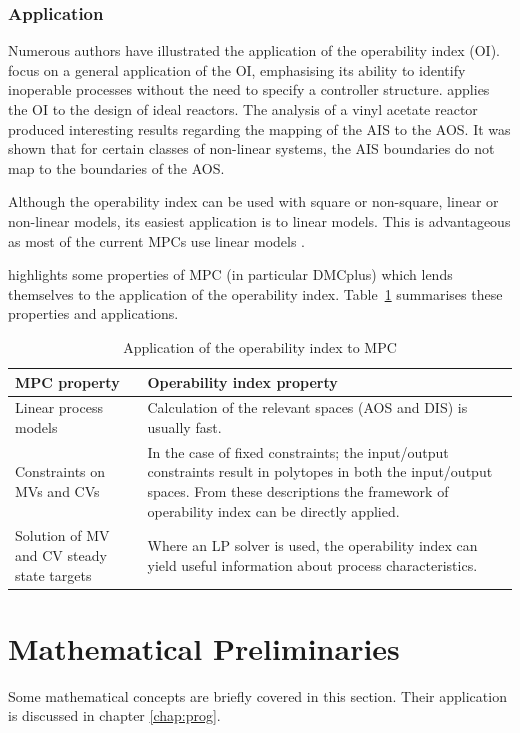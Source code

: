 \subsubsection{Application}
Numerous authors have illustrated the application of the operability index (OI). 
\citet{opconproc} focus on a general application of the OI, emphasising its ability to identify inoperable processes without the need to specify a controller structure. 
\citet{opidealrx} applies the OI to the design of ideal reactors. 
The analysis of a vinyl acetate reactor produced interesting results
regarding the mapping of the AIS to the AOS. 
It was shown that for certain classes of non-linear systems, the AIS boundaries do not map to the boundaries of the AOS.

Although the  operability index can be used with square or non-square, linear or non-linear models, its easiest application is to linear models. 
This is advantageous as most of the current MPCs use linear models \citep{vinsonphd}.

\citet{vinsonphd} highlights some properties of MPC (in particular DMCplus) which lends themselves to the  application of the operability index.
Table~\ref{tab:mpcoi} summarises these properties and applications.
\begin{table}[htbp]
  \centering
  \caption[Application of the operability index to MPC]{Application of the
    operability index to MPC \citep{vinsonphd}}
  \label{tab:mpcoi}
    \begin{tabular}{p{6cm} p{9cm}}
      \toprule
      MPC property & Operability index property \\
      \midrule
      Linear process models & Calculation of the relevant spaces (AOS and DIS) is usually fast.\\
      Constraints on MVs and CVs & In the case of fixed constraints; the input/output constraints result in polytopes in both the input/output spaces. 
From these descriptions the framework of operability index can be directly applied.\\
      Solution of MV and CV steady state targets  & Where an LP solver is used, the operability index can yield useful information about process characteristics.\\
      \bottomrule
    \end{tabular}
\end{table}

\section{Mathematical Preliminaries}
Some mathematical concepts are briefly covered in this section.
Their application is discussed in chapter \ref{chap:prog}.

